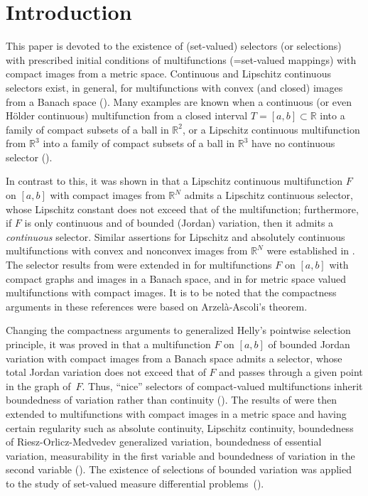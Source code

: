 \documentclass[preprint,12pt]{elsarticle}
\newcommand{\Rb}{\mathbb{R}}  \newcommand{\Nb}{\mathbb{N}}
\begin{document}
\section{Introduction} \label{s:intro}

This paper is devoted to the existence of (set-valued) selectors (or selections) with
prescribed initial conditions of multifunctions (=set-valued mappings) with compact
images from a metric space. Continuous and Lipschitz continuous selectors exist,
in general, for multifunctions with convex (and closed) images from a Banach space
(\cite{AF,Michael,RS}). Many examples are known when a continuous (or even
H{\"o}lder continuous) multifunction from a closed interval $T=[a,b]\subset\Rb$
into a family of compact subsets of a ball in $\Rb^2$, or a Lipschitz continuous multifunction
from $\Rb^3$ into a family of compact subsets of a ball in $\Rb^3$ have no 
continuous selector
(\cite{AC,Posit98,Hermes69,Kupka96,Michael}).

In contrast to this, it was shown in \cite{Hermes} that a Lipschitz continuous
multifunction $F$ on $[a,b]$ with compact images from $\Rb^N$ admits a Lipschitz
continuous selector, whose Lipschitz constant does not exceed that of the multifunction;
furthermore, if $F$ is only continuous and of bounded (Jordan) variation, then
it admits a \emph{continuous\/} selector. Similar assertions for Lipschitz and
absolutely continuous multifunctions with convex and nonconvex images from $\Rb^N$
were established in \cite{GurKos,Kik-Tom,Kupka,Zhu}. The selector results
from \cite{Hermes} were extended in \cite[Suppl.~1]{Mor} for multifunctions
$F$ on $[a,b]$ with compact graphs and images in a Banach space, and in \cite{Slezak}
for metric space valued multifunctions with compact images. It is to be noted that the
compactness arguments in these references were based on Arzel{\`a}-Ascoli's theorem.

Changing the compactness arguments to generalized Helly's pointwise selection
principle, it was proved in \cite{JDCS} that a multifunction $F$ on $[a,b]$ of bounded
Jordan variation with compact images from a Banach space admits a selector,
whose total Jordan variation does not exceed that of $F$ and passes through a
given point in the graph of~$F$. Thus, ``nice'' selectors of compact-valued multifunctions
inherit boundedness of variation rather than continuity (\cite{Sovae}).
The results of \cite{JDCS} were then extended to multifunctions with compact
images in a metric space and having certain regularity such as absolute continuity,
Lipschitz continuity, boundedness of Riesz-Orlicz-Medvedev generalized variation,
boundedness of essential variation, measurability in the first variable and boundedness
of variation in the second variable (\cite{JMAA,MatSb,Pontr,Posit01,MZ,%
Sovae,JFA05,Studia}). The existence of selections of bounded variation was applied
to the study of set-valued measure differential problems~(\cite{Satco}).
\end{document}
